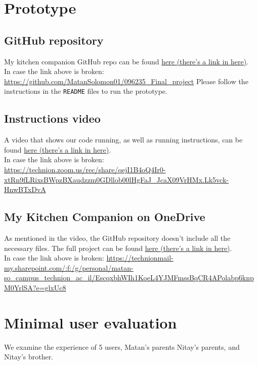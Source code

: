 \documentclass[]{article}
\begin{document}
\section{Prototype}
\subsection{GitHub repository}
My kitchen companion GitHub repo can be found \href{https://github.com/MatanSolomon01/096235_Final_project}{here (there's a link in here)}. \\
\linebreak
In case the link above is broken: \url{https://github.com/MatanSolomon01/096235_Final_project}
Please follow the instructions in the \verb|README| files to run the prototype.

\subsection{Instructions video}
A video that shows our code running, as well as running instructions, can be found \href{https://technion.zoom.us/rec/share/qejI1B4oQ4Ir0-xtRn9fLRixsBWpzBXaudzzm0GDllob00lHgFaJ_JcaX09VrHMx.Lk5vck-HnwBTxDvA}{here (there's a link in here)}. \\
\linebreak
In case the link above is broken: \url{https://technion.zoom.us/rec/share/qejI1B4oQ4Ir0-xtRn9fLRixsBWpzBXaudzzm0GDllob00lHgFaJ_JcaX09VrHMx.Lk5vck-HnwBTxDvA}

\subsection{My Kitchen Companion on OneDrive}
As mentioned in the video, the GitHub repository doesn't include all the necessary files. The full project can be found \href{https://technionmail-my.sharepoint.com/:f:/g/personal/matan-so_campus_technion_ac_il/EscqxbhWIh1KoeL4YJMFmssBqCR4APolabp6knpM0YrlSA?e=glxUc8}{here (there's a link in here)}. \\
\linebreak
In case the link above is broken: \url{https://technionmail-my.sharepoint.com/:f:/g/personal/matan-so_campus_technion_ac_il/EscqxbhWIh1KoeL4YJMFmssBqCR4APolabp6knpM0YrlSA?e=glxUc8}

\pagebreak

\section{Minimal user evaluation}
We examine the experience of 5 users, Matan's parents Nitay's parents, and Nitay's brother.
\end{document}
